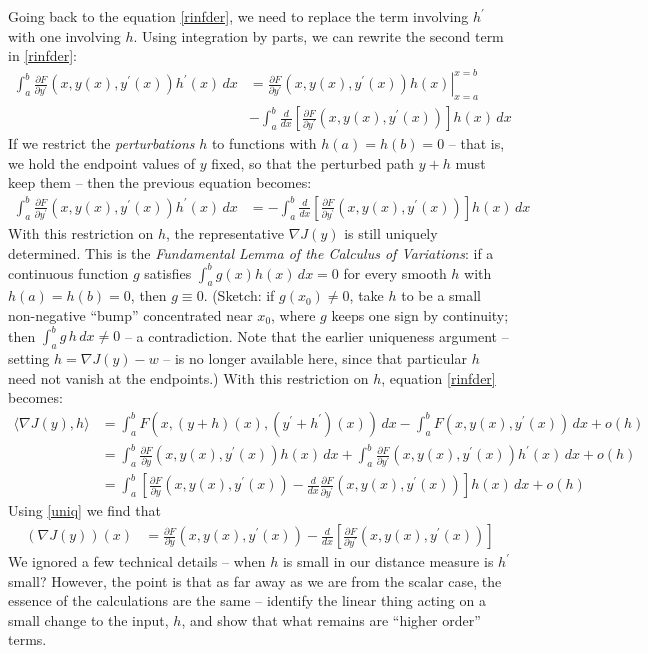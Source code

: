 \documentclass{article}
\begin{document}
Going back to the equation \eqref{rinfder}, we need to replace the term involving
$h^\prime$ with one involving $h$. Using integration by parts, we can rewrite the
second term in \eqref{rinfder}:
\begin{align}
\int_a^b \frac{\partial F}{\partial y^\prime}(x, y(x), y^\prime(x))h^\prime(x) \, dx
&=
\left. \frac{\partial F}{\partial y^\prime}(x, y(x), y^\prime(x))
  h(x)\right|_{x=a}^{x=b} \nonumber \\
&- \int_a^b \frac{d}{dx}
\left[
  \frac{\partial F}{\partial y^\prime}(x, y(x), y^\prime(x))
  \right]
  h(x) \, dx
\end{align}
If we restrict the {\em perturbations\/} $h$ to functions with
$h(a) = h(b) = 0$ -- that is, we hold the endpoint values of $y$ fixed, so
that the perturbed path $y + h$ must keep them -- then
the previous equation becomes:
\begin{align}
\int_a^b \frac{\partial F}{\partial y^\prime}(x, y(x), y^\prime(x))h^\prime(x) \, dx
&=  - \int_a^b \frac{d}{dx}
\left[
  \frac{\partial F}{\partial y^\prime}(x, y(x), y^\prime(x))
  \right]
  h(x) \, dx
\end{align}
With this restriction on $h$, the representative $\nabla J(y)$ is still
uniquely determined. This is the {\em Fundamental Lemma of the Calculus of
Variations\/}: if a continuous function $g$ satisfies
$\int_a^b g(x) h(x)\, dx = 0$ for every smooth $h$ with $h(a) = h(b) = 0$,
then $g \equiv 0$. (Sketch: if $g(x_0) \neq 0$, take $h$ to be a small
non-negative ``bump'' concentrated near $x_0$, where $g$ keeps one sign by
continuity; then $\int_a^b g\, h \, dx \neq 0$ -- a contradiction. Note that
the earlier uniqueness argument -- setting $h = \nabla J(y) - w$ -- is no
longer available here, since that particular $h$ need not vanish at the
endpoints.)
With this restriction on $h$,
equation \eqref{rinfder} becomes:
\begin{align}
  \langle \nabla J(y), h \rangle  &= \int_a^b F(x, (y+h)(x), (y^\prime + h^\prime)(x) )\, dx
  - \int_a^b F(x, y(x), y^\prime(x)) \, dx  + o(h) \nonumber \\
  &= \int_a^b \frac{\partial F}{\partial y}(x, y(x), y^\prime(x))h(x)\, dx
+ \int_a^b \frac{\partial F}{\partial y^\prime}(x, y(x), y^\prime(x))h^\prime(x) \, dx
+ o(h) \nonumber \\
&= \int_a^b \left[ \frac{\partial F}{\partial y}(x, y(x), y^\prime(x)) -
\frac{d}{dx}\frac{\partial F}{\partial y^\prime}(x, y(x), y^\prime(x))\right]h(x)\, dx
+ o(h)
\end{align}
Using \eqref{uniq} we find that
\begin{align}
  (\nabla J(y))(x) &= \frac{\partial F}{\partial y}(x, y(x), y^\prime(x))
  - \frac{d}{dx} \left[ \frac{\partial F}{\partial y^\prime}(x, y(x), y^\prime(x))\right]
                         \label{risz_rep2}
\end{align}
We ignored a few technical details -- when $h$ is small in our distance measure is
$h^\prime$ small? However, the point is that as far away as we are from the scalar
case, the essence of the calculations are the same -- identify the linear thing
acting on a small change to the input, $h$, and show that what remains are
``higher order''{} terms.
\end{document}
